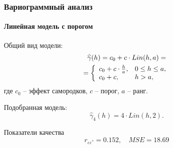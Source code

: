 \documentclass{beamer}
\begin{document}
\begin{frame}
  \frametitle{Вариограммный анализ}
  \framesubtitle{Линейная модель с порогом}
  \begin{multicols}{2}
    \begin{small}
      Общий вид модели:
      \begin{equation}\begin{gathered}
      \label{eq:linsill}
        \widehat{\gamma}(h) = c_0 + c \cdot Lin(h, a) = \\
        = \left\{
        \begin{array}{l l}
         c_0 + c \cdot \frac{h}{a}, & 0 \leq h \leq a, \\
         c_0 + c, & h > a,
        \end{array} \right.
      \end{gathered}\end{equation}
      где $ c_0 $ -- эффект самородков, $ c $ -- порог, $ a $ -- ранг.
      
      \medskip
      
      Подобранная модель:
      \begin{equation}
      \label{eq:gamma4}
        \widehat{\gamma}_4(h) = 4 \cdot Lin(h, 2).
      \end{equation}
      
      Показатели качества
      \begin{equation*}
        r_{\varepsilon\varepsilon^{*}} = 0.152, \quad MSE = 18.69
      \end{equation*}
    \end{small}
    

\end{multicols}
\end{frame}
\end{document}
